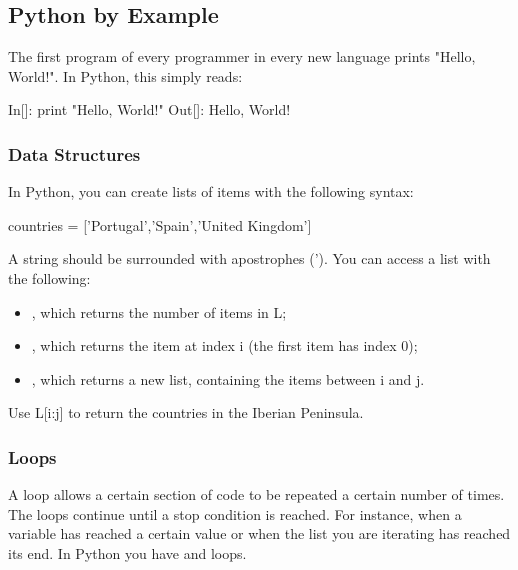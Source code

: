 \subsection{Python by Example}


The first program of every programmer in every new language prints "Hello,
World!". In Python, this simply reads:

\begin{python}
 In[]: print "Hello, World!"
Out[]: Hello, World!
\end{python}


\subsubsection{Data Structures}

In Python, you can create lists of items with the following syntax:

\begin{python}
countries = ['Portugal','Spain','United Kingdom']
\end{python}

A string should be surrounded with apostrophes ('). You can access a list with
the following:

\begin{itemize}
 \item {}, which returns the number of items in L;
 \item {}, which returns the item at index i (the first item has index 0);
 \item {}, which returns a new list, containing the items between i and j. 
\end{itemize}

\begin{exercise}
 Use L[i:j] to return the countries in the Iberian Peninsula.
\end{exercise}

\subsubsection{Loops}

A loop allows a certain section of code to be repeated a certain number of
times. The loops continue until a stop condition is reached. For instance, when
a variable has reached a certain value or when the list you are iterating has
reached its end. In Python you have  and  loops.

